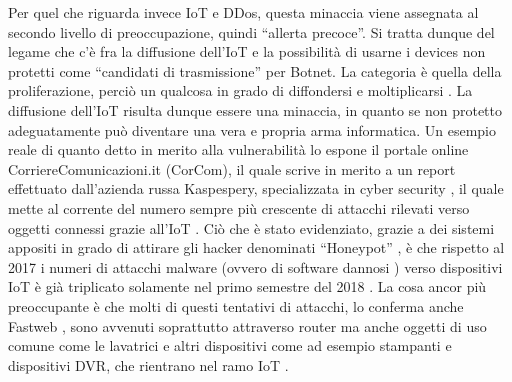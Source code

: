 Per quel che riguarda invece IoT e DDos, questa minaccia viene assegnata al secondo livello di preoccupazione, quindi “allerta precoce”. Si tratta dunque del legame che c’è fra la diffusione dell’IoT e la possibilità di usarne i devices non protetti come “candidati di trasmissione” per Botnet. La categoria è quella della proliferazione, perciò un qualcosa in grado di diffondersi e moltiplicarsi .
La diffusione dell’IoT risulta dunque essere una minaccia, in quanto se non protetto adeguatamente può diventare una vera e propria arma informatica. 
Un esempio reale di quanto detto in merito alla vulnerabilità lo espone il portale online CorriereComunicazioni.it (CorCom), il quale scrive in merito a un report effettuato dall’azienda russa Kaspespery, specializzata in cyber security , il quale mette al corrente del numero sempre più crescente di attacchi rilevati verso oggetti connessi grazie all’IoT . Ciò che è stato evidenziato, grazie a dei sistemi appositi in grado di attirare gli hacker denominati “Honeypot” , è che rispetto al 2017 i numeri di attacchi malware (ovvero di software dannosi ) verso dispositivi IoT è già triplicato solamente nel primo semestre del 2018 . La cosa ancor più preoccupante è che molti di questi tentativi di attacchi, lo conferma anche Fastweb , sono avvenuti soprattutto attraverso router ma anche oggetti di uso comune come le lavatrici e altri dispositivi come ad esempio stampanti e dispositivi DVR, che rientrano nel ramo IoT .
